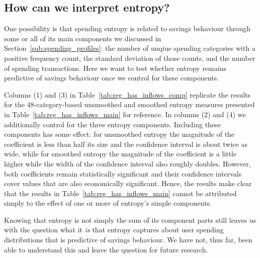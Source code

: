 \subsection{How can we interpret entropy?}%
\label{sub:is_entropy_more_than_the_sum_of_its_parts_}

One possibility is that spending entropy is related to savings behaviour
through some or all of its main components we discussed in
Section~\ref{sub:spending_profiles}: the number of unqiue spending categories
with a positive frequency count, the standard deviation of those counts, and
the number of spending transactions. Here we want to test whether entropy
remains predictive of savings behaviour once we control for these components.



Columns (1) and (3) in Table~\ref{tab:reg_has_inflows_comp} replicate the
results for the 48-category-based unsmoothed and smoothed entropy measures
presented in Table~\ref{tab:reg_has_inflows_main} for reference. In columns (2)
and (4) we additionally control for the three entropy components. Including
these components has some effect: for unsmoothed entropy the magnitude of the
coefficient is less than half its size and the confidence interval is about
twice as wide, while for smoothed entropy the magnitude of the coefficient is a
little higher while the width of the confidence interval also roughly doubles.
However, both coefficients remain statistically significant and their
confidence intervals cover values that are also economically significant.
Hence, the results make clear that the results in
Table~\ref{tab:reg_has_inflows_main} cannot be attributed simply to the effect
of one or more of entropy's simple components.

Knowing that entropy is not simply the sum of its component parts still leaves
us with the question what it \textit{is} that entropy captures about user
spending distributions that is predictive of savings behaviour. We have not,
thus far, been able to understand this and leave the question for future
research.



